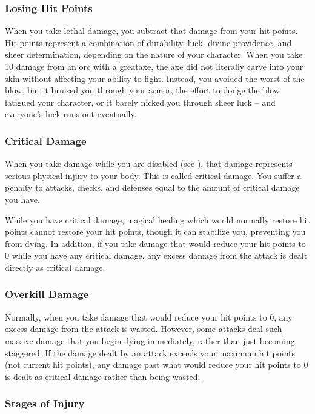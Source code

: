 \subsubsection{Losing Hit Points}
When you take lethal damage, you subtract that damage from your hit points.
 Hit points represent a combination of durability, luck, divine providence, and sheer determination, depending on the nature of your character.
When you take 10 damage from an orc with a greataxe, the axe did not literally carve into your skin without affecting your ability to fight.
Instead, you avoided the worst of the blow, but it bruised you through your armor, the effort to dodge the blow fatigued your character, or it barely nicked you through sheer luck -- and everyone's luck runs out eventually.

\subsubsection{Critical Damage}\label{Critical Damage}
When you take damage while you are disabled (see ), that damage represents serious physical injury to your body.
This is called critical damage.
You suffer a penalty to attacks, checks, and defenses equal to the amount of critical damage you have.

While you have critical damage, magical healing which would normally restore hit points cannot restore your hit points, though it can stabilize you, preventing you from dying.
In addition, if you take damage that would reduce your hit points to 0 while you have any critical damage, any excess damage from the attack is dealt directly as critical damage.

\subsubsection{Overkill Damage}
Normally, when you take damage that would reduce your hit points to 0, any excess damage from the attack is wasted.
However, some attacks deal such massive damage that you begin dying immediately, rather than just becoming staggered.
If the damage dealt by an attack exceeds your maximum hit points (not current hit points), any damage past what would reduce your hit points to 0 is dealt as critical damage rather than being wasted.

\subsubsection{Stages of Injury}

